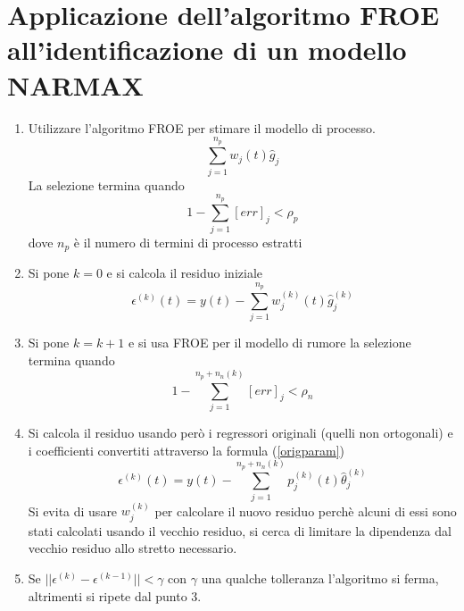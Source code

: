 \section{Applicazione dell'algoritmo FROE all'identificazione di un modello NARMAX}
\begin{enumerate}
\item Utilizzare l'algoritmo FROE per stimare il modello di processo.
\begin{equation}
\sum^{n_p}_{j=1}w_{j}(t)\hat{g}_{j}
\end{equation}
La selezione termina quando
\begin{equation}
1-\sum^{n_p}_{j=1}[err]_j<\rho_p
\end{equation} 
dove $n_p$ è il numero di termini di processo estratti
\item Si pone $k=0$ e si calcola il residuo iniziale
\begin{equation}
\epsilon^{(k)}(t)=y(t)-\sum^{n_p}_{j=1}w_{j}^{(k)}(t)\hat{g}_{j}^{(k)}
\end{equation}
\item Si pone $k=k+1$ e si usa FROE per il modello di rumore
la selezione termina quando
\begin{equation}
1-\sum^{n_p+n_n(k)}_{j=1}[err]_j<\rho_n
\end{equation} 
\item Si calcola il residuo usando però i regressori originali (quelli non ortogonali) e i coefficienti convertiti attraverso la formula (\ref{origparam})
\begin{equation}
\epsilon^{(k)}(t)=y(t)-\sum^{n_p+n_n(k)}_{j=1}p_{j}^{(k)}(t)\hat{\theta}_{j}^{(k)}
\end{equation}
Si evita di usare $w_{j}^{(k)}$ per calcolare il nuovo residuo perchè alcuni di essi sono stati calcolati usando il vecchio residuo, si cerca di limitare la dipendenza dal vecchio residuo allo stretto necessario.
\item Se $||\epsilon^{(k)}-\epsilon^{(k-1)} ||<\gamma$ con $\gamma$ una qualche tolleranza l'algoritmo si ferma, altrimenti si ripete dal punto 3.
\end{enumerate}
